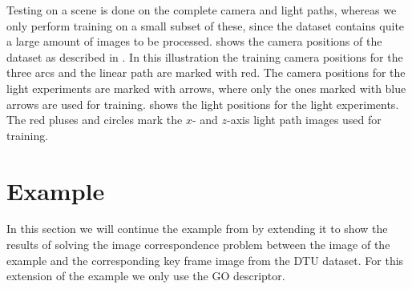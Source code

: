 \documentclass[thesis.tex]{subfiles}
\begin{document}
Testing on a scene is done on the complete camera and light paths, whereas we only perform training on a small subset of these, since the dataset contains quite a large amount of images to be processed.  shows the camera positions of the dataset as described in . In this illustration the training camera positions for the three arcs and the linear path are marked with red. The camera positions for the light experiments are marked with arrows, where only the ones marked with blue arrows are used for training.  shows the light positions for the light experiments. The red pluses and circles mark the $x$- and $z$-axis light path images used for training.
%
\section{Example}
%
In this section we will continue the example from  by extending it to show the results of solving the image correspondence problem between the image of the example and the corresponding key frame image from the DTU dataset. For this extension of the example we only use the GO descriptor.
\end{document}
